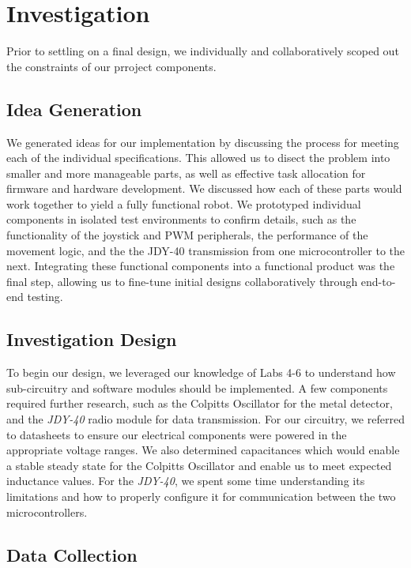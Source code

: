 \documentclass{article}
\begin{document}
\section{Investigation}

Prior to settling on a final design, we individually and collaboratively scoped out the constraints of our prroject components.

\subsection{Idea Generation}

We generated ideas for our implementation by discussing the process for meeting each of the individual specifications.
This allowed us to disect the problem into smaller and more manageable parts, as well as effective task allocation for firmware and
hardware development. We discussed how each of these parts would work together to yield a fully functional robot. We prototyped individual components
in isolated test environments to confirm details, such as the functionality of the joystick and PWM peripherals, the performance of the movement logic,
and the the JDY-40 transmission from one microcontroller to the next. Integrating these functional components into a functional product was the
final step, allowing us to fine-tune initial designs collaboratively through end-to-end testing.

\subsection{Investigation Design}

To begin our design, we leveraged our knowledge of Labs 4-6 to understand how sub-circuitry and software modules should be implemented. A few components required further research, such as the Colpitts Oscillator for the metal detector, and the \textit{JDY-40} radio module for data transmission.
For our circuitry, we referred to datasheets to ensure our electrical components were powered in the appropriate voltage ranges.
We also determined capacitances which would enable a stable steady state for the Colpitts Oscillator and enable us to meet expected inductance values.
For the \textit{JDY-40}, we spent some time understanding its limitations and how to properly configure it for communication between the two microcontrollers.

\subsection{Data Collection}
\end{document}
